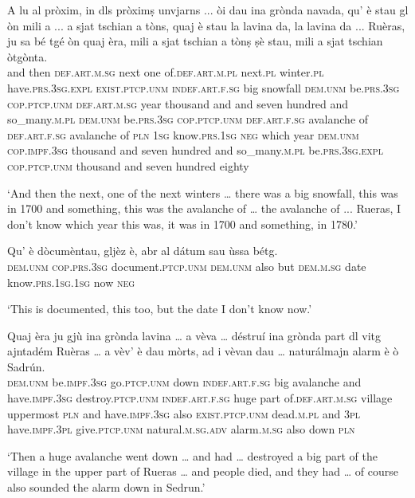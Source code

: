 \begin{linenumbers}
\gll    A lu al pròxim, in dls pròximṣ unvjarns ... òi dau ina grònda navada, qu’ è stau gl òn mili a ... a sjat tschian a tòns, quaj è stau la lavina da, la lavina da ... Ruèras, ju sa bé tgé òn quaj èra, mili a sjat tschian a tònṣ ṣè stau, mili a sjat tschian òtgònta.\\
and then \textsc{def.art.m.sg} next one of.\textsc{def.art.m.pl} next.\textsc{pl} winter.\textsc{pl} {} have.\textsc{prs.3sg}.\textsc{expl} \textsc{exist.ptcp.unm} \textsc{indef.art.f.sg} big snowfall \textsc{dem.unm} be.\textsc{prs.3sg} \textsc{cop.ptcp.unm} \textsc{def.art.m.sg} year thousand and {} and seven hundred and so\_many.\textsc{m.pl} \textsc{dem.unm} be.\textsc{prs.3sg} \textsc{cop.ptcp.unm} \textsc{def.art.f.sg} avalanche of \textsc{def.art.f.sg} avalanche of {} \textsc{pln} \textsc{1sg}  know.\textsc{prs.1sg} \textsc{neg} which year \textsc{dem.unm} \textsc{cop.impf.3sg} thousand and seven hundred and so\_many.\textsc{m.pl} be.\textsc{prs.3sg}.\textsc{expl} \textsc{cop.ptcp.unm} thousand and seven hundred eighty\\
\end{linenumbers}
\medskip 
\glt `And then the next, one of the next winters … there was a big snowfall, this was in 1700 and something, this was the avalanche of … the avalanche of ... Rueras, I don’t know which year this was, it was in 1700 and something, in 1780.'
\medskip

\begin{linenumbers}
\gll Qu’ è dòcumèntau, gljèz è, abr al dátum sau ùssa bétg.\\
\textsc{dem.unm} \textsc{cop.prs.3sg} document.\textsc{ptcp.unm} \textsc{dem.unm} also but \textsc{dem.m.sg} date know.\textsc{prs.1sg.1sg} now \textsc{neg}\\
\end{linenumbers}
\medskip
\glt `This is documented, this too, but the date I don’t know now.' 

\begin{linenumbers}
\gll    Quaj èra ju gjù ina grònda lavina … a vèva … déstruí ina grònda part dl vitg ajntadém Ruèras … a vèv’ è dau mòrts, ad i vèvan dau … naturálmajn alarm è ò Sadrún.\\
\textsc{dem.unm} be.\textsc{impf.3sg} go.\textsc{ptcp.unm} down \textsc{indef.art.f.sg} big avalanche {} and have.\textsc{impf.3sg} {} destroy.\textsc{ptcp.unm} \textsc{indef.art.f.sg} huge part of.\textsc{def.art.m.sg} village uppermost \textsc{pln} {} and have.\textsc{impf.3sg} also \textsc{exist.ptcp.unm} dead.\textsc{m.pl} and \textsc{3pl} have.\textsc{impf.3pl} give.\textsc{ptcp.unm} {} natural.\textsc{m.sg.adv} alarm.\textsc{m.sg} also down \textsc{pln}\\
\end{linenumbers}
\medskip
\glt `Then a huge avalanche went down … and had … destroyed a big part of the village in the upper part of Rueras … and people died, and they had … of course also sounded the alarm down in Sedrun.'
\medskip

